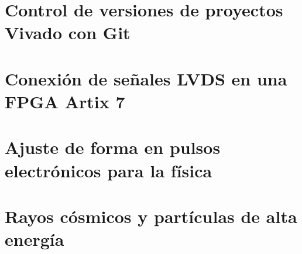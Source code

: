 \documentclass[11pt,letterpaper,oneside]{phstylee}
\begin{document}
\appendix
\chapter{Control de versiones de proyectos Vivado con Git}
\label{git}


\chapter{Conexión de señales LVDS en una FPGA Artix 7}
\label{lvds}


\chapter{Ajuste de forma en pulsos electrónicos para la física}
\label{shaping}


\chapter{Rayos cósmicos y partículas de alta energía}
\label{muon}





\end{document}
